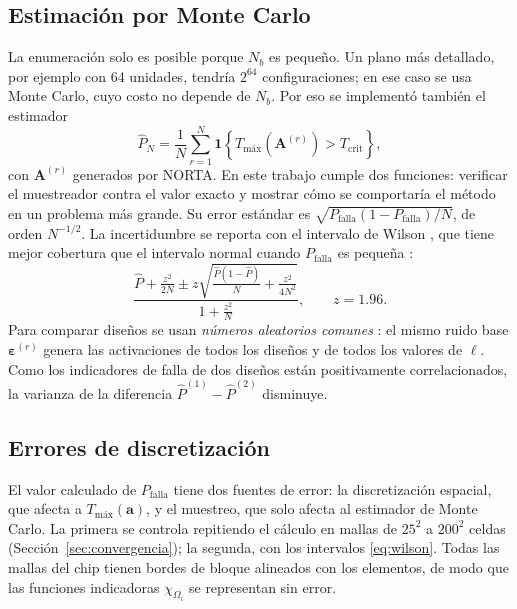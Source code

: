\documentclass[preprint,11pt,sort&compress]{elsarticle}
\newcommand{\Pf}{P_{\mathrm{falla}}}
\newcommand{\Tc}{T_{\mathrm{crit}}}
\newcommand{\Tmax}{T_{\mathrm{máx}}}
\renewcommand{\vec}[1]{\bm{#1}}
\begin{document}
\subsection{Estimación por Monte Carlo}

La enumeración solo es posible porque $N_b$ es pequeño. Un plano más detallado, por
ejemplo con 64 unidades, tendría $2^{64}$ configuraciones; en ese caso se usa Monte Carlo,
cuyo costo no depende de $N_b$. Por eso se implementó también el estimador
\begin{equation}
  \hat P_N=\frac1N\sum_{r=1}^N\mathbf 1\!\left\{\Tmax(\vec A^{(r)})>\Tc\right\},
  \label{eq:mc}
\end{equation}
con $\vec A^{(r)}$ generados por NORTA. En este trabajo cumple dos funciones: verificar el
muestreador contra el valor exacto y mostrar cómo se comportaría el método en un problema
más grande. Su error estándar es $\sqrt{\Pf(1-\Pf)/N}$, de orden $N^{-1/2}$. La
incertidumbre se reporta con el intervalo de Wilson \cite{wilson1927}, que tiene mejor
cobertura que el intervalo normal cuando $\Pf$ es pequeña
\cite{agresti1998,brown2001interval}:
\begin{equation}
  \frac{\hat P+\frac{z^2}{2N}\pm z\sqrt{\frac{\hat P(1-\hat P)}{N}+\frac{z^2}{4N^2}}}
       {1+\frac{z^2}{N}},\qquad z=\num{1.96}.
  \label{eq:wilson}
\end{equation}
Para comparar diseños se usan \emph{números aleatorios comunes}
\cite{glasserman2003}: el mismo ruido base $\vec\varepsilon^{(r)}$ genera las activaciones
de todos los diseños y de todos los valores de $\ell$. Como los indicadores de falla de dos
diseños están positivamente correlacionados, la varianza de la diferencia
$\hat P^{(1)}-\hat P^{(2)}$ disminuye.

\subsection{Errores de discretización}

El valor calculado de $\Pf$ tiene dos fuentes de error: la discretización espacial, que
afecta a $\Tmax(\vec a)$, y el muestreo, que solo afecta al estimador de Monte Carlo. La
primera se controla repitiendo el cálculo en mallas de $25^2$ a $200^2$ celdas
(Sección~\ref{sec:convergencia}); la segunda, con los intervalos \eqref{eq:wilson}. Todas
las mallas del chip tienen bordes de bloque alineados con los elementos, de modo que las
funciones indicadoras $\chi_{\Omega_i}$ se representan sin error.

\end{document}

